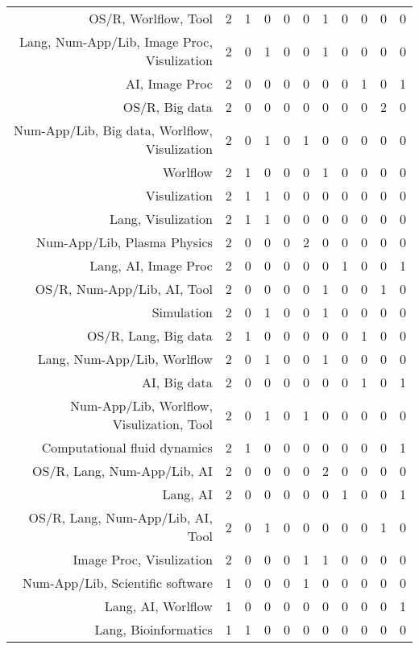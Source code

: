 {\begin{landscape}
\begin{longtable}[htb]{r|c|c|c|c|c|c|c|c|c|c}
{OS/R, Worlflow, Tool} & 2 & 1 & 0 & 0 & 0 & 1 & 0 & 0 & 0 & 0 \\%
{Lang, Num-App/Lib, Image Proc, Visulization} & 2 & 0 & 1 & 0 & 0 & 1 & 0 & 0 & 0 & 0 \\%
{AI, Image Proc} & 2 & 0 & 0 & 0 & 0 & 0 & 0 & 1 & 0 & 1 \\%
{OS/R, Big data} & 2 & 0 & 0 & 0 & 0 & 0 & 0 & 0 & 2 & 0 \\%
{Num-App/Lib, Big data, Worlflow, Visulization} & 2 & 0 & 1 & 0 & 1 & 0 & 0 & 0 & 0 & 0 \\%
{Worlflow} & 2 & 1 & 0 & 0 & 0 & 1 & 0 & 0 & 0 & 0 \\%
{Visulization} & 2 & 1 & 1 & 0 & 0 & 0 & 0 & 0 & 0 & 0 \\%
{Lang, Visulization} & 2 & 1 & 1 & 0 & 0 & 0 & 0 & 0 & 0 & 0 \\%
{Num-App/Lib, Plasma Physics} & 2 & 0 & 0 & 0 & 2 & 0 & 0 & 0 & 0 & 0 \\%
{Lang, AI, Image Proc} & 2 & 0 & 0 & 0 & 0 & 0 & 1 & 0 & 0 & 1 \\%
{OS/R, Num-App/Lib, AI, Tool} & 2 & 0 & 0 & 0 & 0 & 1 & 0 & 0 & 1 & 0 \\%
{Simulation} & 2 & 0 & 1 & 0 & 0 & 1 & 0 & 0 & 0 & 0 \\%
{OS/R, Lang, Big data} & 2 & 1 & 0 & 0 & 0 & 0 & 0 & 1 & 0 & 0 \\%
{Lang, Num-App/Lib, Worlflow} & 2 & 0 & 1 & 0 & 0 & 1 & 0 & 0 & 0 & 0 \\%
{AI, Big data} & 2 & 0 & 0 & 0 & 0 & 0 & 0 & 1 & 0 & 1 \\%
{Num-App/Lib, Worlflow, Visulization, Tool} & 2 & 0 & 1 & 0 & 1 & 0 & 0 & 0 & 0 & 0 \\%
{Computational fluid dynamics} & 2 & 1 & 0 & 0 & 0 & 0 & 0 & 0 & 0 & 1 \\%
{OS/R, Lang, Num-App/Lib, AI} & 2 & 0 & 0 & 0 & 0 & 2 & 0 & 0 & 0 & 0 \\%
{Lang, AI} & 2 & 0 & 0 & 0 & 0 & 0 & 1 & 0 & 0 & 1 \\%
{OS/R, Lang, Num-App/Lib, AI, Tool} & 2 & 0 & 1 & 0 & 0 & 0 & 0 & 0 & 1 & 0 \\%
{Image Proc, Visulization} & 2 & 0 & 0 & 0 & 1 & 1 & 0 & 0 & 0 & 0 \\%
{Num-App/Lib, Scientific software} & 1 & 0 & 0 & 0 & 1 & 0 & 0 & 0 & 0 & 0 \\%
{Lang, AI, Worlflow} & 1 & 0 & 0 & 0 & 0 & 0 & 0 & 0 & 0 & 1 \\%
{Lang, Bioinformatics} & 1 & 1 & 0 & 0 & 0 & 0 & 0 & 0 & 0 & 0 \\%

\end{longtable}
\end{landscape}}
